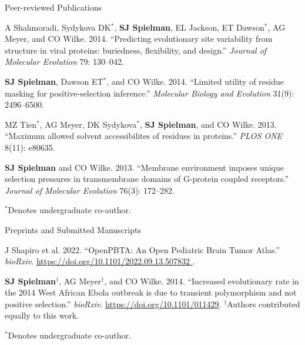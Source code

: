 \documentclass{resume} %
\begin{document}
\begin{rSection}{Peer-reviewed Publications}
\begin{etaremune}[leftmargin=1.5em]
\item A Shahmoradi, Sydykova DK$^\ast$, \textbf{SJ Spielman}, EL Jackson, ET Dawson$^\ast$, AG Meyer, and CO Wilke. 2014. ``Predicting evolutionary site variability from structure in viral proteins: buriedness, flexibility, and design.'' \emph{Journal of Molecular Evolution} 79: 130--042.

\item \textbf{SJ Spielman}, Dawson ET$^\ast$, and CO Wilke. 2014. ``Limited utility of residue masking for positive-selection inference.'' \emph{Molecular Biology and Evolution} 31(9): 2496--6500.

\item MZ Tien$^\ast$, AG Meyer, DK Sydykova$^\ast$, \textbf{SJ Spielman}, and CO Wilke. 2013. ``Maximum allowed solvent accessibilites of residues in proteins.'' \emph{PLOS ONE} 8(11): e80635.

\item \textbf{SJ Spielman} and CO Wilke. 2013. ``Membrane environment imposes unique selection pressures in transmembrane domains of G-protein coupled receptors.'' \emph{Journal of Molecular Evolution} 76(3): 172--282.

\end{etaremune}

$^\ast$Denotes undergraduate co-author.
\end{rSection}



\vspace*{0.35cm}
\begin{rSection}{Preprints and Submitted Manuscripts}
\vspace*{0.25cm}

\begin{etaremune}[leftmargin=1.5em]

\item J Shapiro et al. 2022. ``OpenPBTA: An Open Pediatric Brain Tumor Atlas.'' \emph{bioRxiv}. \url{https://doi.org/10.1101/2022.09.13.507832 }.


\item \textbf{SJ Spielman}$^\dagger$, AG Meyer$^\dagger$, and CO Wilke. 2014. ``Increased evolutionary rate in the 2014 West African Ebola outbreak is due to transient polymorphism and not positive selection.'' \emph{bioRxiv}. \url{https://doi.org/10.1101/011429}. $^\dagger$Authors contributed equally to this work.

\end{etaremune}


$^\ast$Denotes undergraduate co-author.

\end{rSection}
\end{document}
